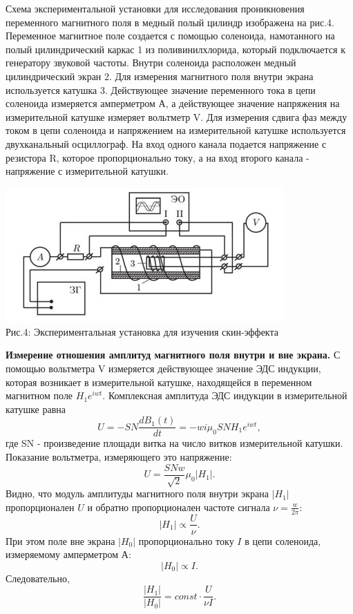 \documentclass[a4paper,12pt]{report}
\begin{document}
Схема экспериментальной установки для исследования проникновения переменного магнитного поля в медный полый цилиндр изображена на рис.4. Переменное магнитное поле создается с помощью соленоида, намотанного на полый цилиндрический каркас 1 из поливинилхлорида, который подключается к генератору звуковой частоты. Внутри соленоида расположен медный цилиндрический экран 2. Для измерения магнитного поля внутри экрана используется катушка 3. Действующее значение переменного тока в цепи соленоида измеряется амперметром А, а действующее значение напряжения на измерительной катушке измеряет вольтметр V. Для измерения сдвига фаз между током в цепи соленоида и напряжением на измерительной катушке используется двухканальный осциллограф. На вход одного канала подается напряжение с резистора R, которое пропорционально току, а на вход второго канала - напряжение с измерительной катушки.
\begin{center}
	\includegraphics[width=0.8\textwidth]{рис4.jpg}\\
	\caption{Рис.4: Экспериментальная установка для изучения скин-эффекта}
\end{center}
\textbf{Измерение отношения амплитуд магнитного поля внутри и вне экрана.} С помощью вольтметра V измеряется действующее значение ЭДС индукции, которая возникает в измерительной катушке, находящейся в переменном магнитном поле \(H_{1}e^{iwt}\). Комплексная амплитуда ЭДС индукции в измерительной катушке равна 
\begin{equation*}
   U=-SN\frac{dB_{1}(t)}{dt} = -wi\mu_{0}SNH_{1}e^{iwt},
\end{equation*}
где SN - произведение площади витка на число витков измерительной катушки. Показание вольтметра, измеряющего это напряжение:
\begin{equation*}
   U=\frac{SNw}{\sqrt{2}}\mu_{0}|H_{1}|.
\end{equation*}
Видно, что модуль амплитуды магнитного поля внутри экрана $|H_{1}|$ пропорционален $U$ и обратно пропорционален частоте сигнала \(\nu=\frac{w}{2\pi}\):
\begin{equation*}
   |H_{1}|\propto \frac{U}{\nu}.
\end{equation*}
При этом  поле вне экрана $|H_{0}|$ пропорционально току $I$ в цепи соленоида, измеряемому амперметром А:
\begin{equation*}
   |H_{0}|\propto I.
\end{equation*}
Следовательно,
\begin{equation}
   \frac{|H_{1}|}{|H_{0}|}=const\cdot \frac{U}{\nu I}.
\end{equation}
\end{document}
